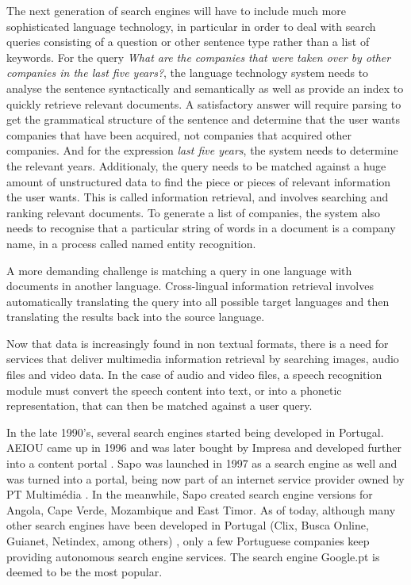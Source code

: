 \begin{multicols}{2}
The next generation of search engines will have to include much more sophisticated language technology, in particular in order to deal with search queries consisting of a question or other sentence type rather than a list of keywords. 
For the query \textit{What are the companies that were taken over by other companies in the last five years?}, 
the language technology system needs to analyse the sentence syntactically and semantically as well as provide an index to quickly retrieve relevant documents. 
A satisfactory answer will require parsing to get the grammatical structure of the sentence and determine 
that the user wants companies that have been acquired, not companies that acquired other companies. 
And for the expression \textit{last five years}, the system needs to determine the relevant years. 
Additionaly, the query needs to be matched against a huge amount of unstructured data to find the piece or pieces of relevant information the user wants. 
This is called information retrieval, and involves searching and ranking relevant documents. 
To generate a list of companies, the system also needs to recognise that a particular string of words in a document is a company name, 
in a process called named entity recognition.


A more demanding challenge is matching a query in one language with documents in another language. 
Cross-lingual information retrieval involves automatically translating the query into all possible target languages 
and then translating the results back into the source language. 

 Now that data is increasingly found in non textual formats, there is a need for services that deliver multimedia 
information retrieval by searching images, audio files and video data. 
In the case of audio and video files, a speech recognition module must convert the speech content into text,
or into a phonetic representation, that can then be matched against a user query.

In the late 1990's, several search engines started being developed in Portugal. 
AEIOU came up in 1996 and was later bought by Impresa and developed further into a content portal \cite{aeiou}. 
Sapo was launched in 1997 as a search engine as well and was turned into a portal, being now part of an internet service provider owned by PT Multimédia \cite{sapo}. 
In the meanwhile, Sapo created search engine versions for Angola, Cape Verde, Mozambique and East Timor. 
As of today, although many other search engines have been developed in Portugal (Clix, Busca Online, Guianet, Netindex, among others) \cite{colossus}, 
only a few Portuguese companies keep providing autonomous search engine services. The search engine Google.pt is deemed to be the most popular.


\end{multicols}
